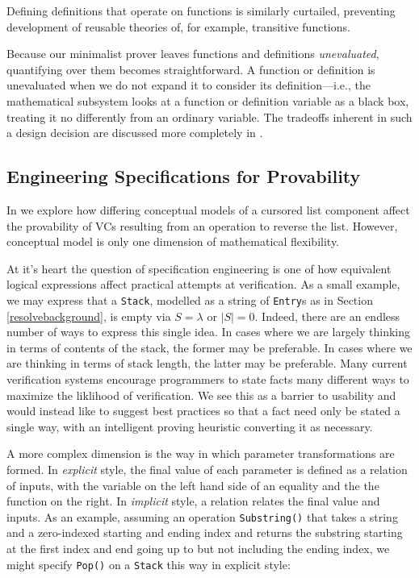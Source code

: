 Defining definitions that operate on functions is similarly curtailed, preventing development of reusable theories of, for example, transitive functions.

Because our minimalist prover leaves functions and definitions \emph{unevaluated}, quantifying over them becomes straightforward.  A function or definition is unevaluated when we do not expand it to consider its definition---i.e., the mathematical subsystem looks at a function or definition variable as a black box, treating it no differently from an ordinary variable.  The tradeoffs inherent in such a design decision are discussed more completely in \cite{unevaluated}.

\subsection{Engineering Specifications for Provability}
In \cite{something} we explore how differing conceptual models of a cursored list component affect the provability of VCs resulting from an operation to reverse the list.  However, conceptual model is only one dimension of mathematical flexibility.

At it's heart the question of specification engineering is one of how equivalent logical expressions affect practical attempts at verification.  As a small example, we may express that a \texttt{Stack}, modelled as a string of \texttt{Entry}s as in Section \ref{resolvebackground}, is empty via $S = \lambda$ or $|S| = 0$.  Indeed, there are an endless number of ways to express this single idea.  In cases where we are largely thinking in terms of contents of the stack, the former may be preferable.  In cases where we are thinking in terms of stack length, the latter may be preferable.  Many current verification systems encourage programmers to state facts many different ways to maximize the liklihood of verification.  We see this as a barrier to usability and would instead like to suggest best practices so that a fact need only be stated a single way, with an intelligent proving heuristic converting it as necessary.

A more complex dimension is the way in which parameter transformations are formed.  In \emph{explicit} style, the final value of each parameter is defined as a relation of inputs, with the variable on the left hand side of an equality and the the function on the right.  In \emph{implicit} style, a relation relates the final value and inputs.  As an example, assuming an operation \texttt{Substring()} that takes a string and a zero-indexed starting and ending index and returns the substring starting at the first index and end going up to but not including the ending index, we might specify \texttt{Pop()} on a \texttt{Stack} this way in explicit style:

